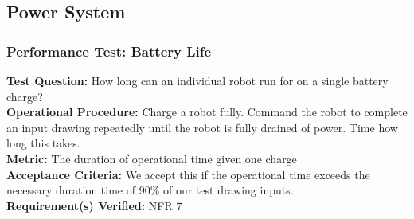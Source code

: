 
\subsection{Power System}
\label{sec:verification_power}

\subsubsection{Performance Test: Battery Life}
\label{test:power_pt_battery}
\textbf{Test Question:} How long can an individual robot run for on a single battery charge? \\
\textbf{Operational Procedure:} Charge a robot fully. Command the robot to complete an input drawing repeatedly until the robot is fully drained of power. Time how long this takes. \\
\textbf{Metric:} The duration of operational time given one charge \\
\textbf{Acceptance Criteria:} We accept this if the operational time exceeds the necessary duration time of 90\% of our test drawing inputs. \\
\textbf{Requirement(s) Verified:} NFR 7